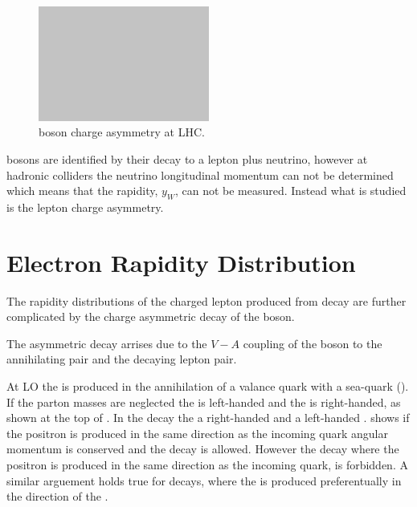 \begin{figure}[htb]
  \centering
  \includegraphics[width=0.5\textwidth]{placeholder}
  \caption{\PW boson charge asymmetry at LHC.}
  \label{wbos:wproddiag}
\end{figure}

\PW bosons are identified by their decay to a lepton plus neutrino, however at
hadronic colliders the neutrino longitudinal momentum can not be determined
which means that the \PW rapidity, $y_{W}$, can not be measured.  Instead what
is studied is the lepton charge asymmetry.



\section{Electron Rapidity Distribution}

The rapidity distributions of the charged lepton produced from \PW decay are
further complicated by the charge asymmetric decay of the \PWpm boson. 

The asymmetric decay arrises due to the $V-A$ coupling of the \PW boson to the
annihilating \HepProcess{\Pquark\APquark} pair and the decaying lepton pair.

At \ac{LO} the \PWp is produced in the annihilation of a \Pup valance quark
with a \APdown sea-quark (). If the parton masses are
neglected the \Pup is left-handed and the \APdown is right-handed, as shown at
the top of . In the \PWp decay the a right-handed
\Ppositron and a left-handed \Pnue.
 shows if the  positron is produced in the same direction
as the incoming \APdown quark angular momentum is conserved and the decay is
allowed.
However the decay where the positron is produced in the same direction as the
incoming \Pup quark, is forbidden.
A similar arguement holds true for \PWm decays, where the \Pelectron is produced
preferentually in the direction of the \Pdown.

